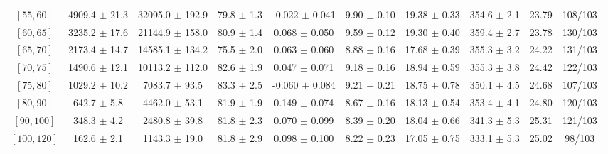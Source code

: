 \begin{tabular}{c||c|c|c|c|c|c|c||c|c}
$[55, 60]$ & 4909.4 $\pm$ 21.3 & 32095.0 $\pm$ 192.9 & 79.8 $\pm$ 1.3 & -0.022 $\pm$ 0.041 & 9.90 $\pm$ 0.10 & 19.38 $\pm$ 0.33 & 354.6 $\pm$ 2.1 & 23.79 & 108/103\\
$[60, 65]$ & 3235.2 $\pm$ 17.6 & 21144.9 $\pm$ 158.0 & 80.9 $\pm$ 1.4 & 0.068 $\pm$ 0.050 & 9.59 $\pm$ 0.12 & 19.30 $\pm$ 0.40 & 359.4 $\pm$ 2.7 & 23.78 & 130/103\\
$[65, 70]$ & 2173.4 $\pm$ 14.7 & 14585.1 $\pm$ 134.2 & 75.5 $\pm$ 2.0 & 0.063 $\pm$ 0.060 & 8.88 $\pm$ 0.16 & 17.68 $\pm$ 0.39 & 355.3 $\pm$ 3.2 & 24.22 & 131/103\\
$[70, 75]$ & 1490.6 $\pm$ 12.1 & 10113.2 $\pm$ 112.0 & 82.6 $\pm$ 1.9 & 0.047 $\pm$ 0.071 & 9.18 $\pm$ 0.16 & 18.94 $\pm$ 0.59 & 355.3 $\pm$ 3.8 & 24.42 & 122/103\\
$[75, 80]$ & 1029.2 $\pm$ 10.2 & 7083.7 $\pm$ 93.5 & 83.3 $\pm$ 2.5 & -0.060 $\pm$ 0.084 & 9.21 $\pm$ 0.21 & 18.75 $\pm$ 0.78 & 350.1 $\pm$ 4.5 & 24.68 & 107/103\\
$[80, 90]$ & 642.7 $\pm$ 5.8 & 4462.0 $\pm$ 53.1 & 81.9 $\pm$ 1.9 & 0.149 $\pm$ 0.074 & 8.67 $\pm$ 0.16 & 18.13 $\pm$ 0.54 & 353.4 $\pm$ 4.1 & 24.80 & 120/103\\
$[90, 100]$ & 348.3 $\pm$ 4.2 & 2480.8 $\pm$ 39.8 & 81.8 $\pm$ 2.3 & 0.070 $\pm$ 0.099 & 8.39 $\pm$ 0.20 & 18.04 $\pm$ 0.66 & 341.3 $\pm$ 5.3 & 25.31 & 121/103\\
$[100, 120]$ & 162.6 $\pm$ 2.1 & 1143.3 $\pm$ 19.0 & 81.8 $\pm$ 2.9 & 0.098 $\pm$ 0.100 & 8.22 $\pm$ 0.23 & 17.05 $\pm$ 0.75 & 333.1 $\pm$ 5.3 & 25.02 & 98/103\\
\end{tabular}
